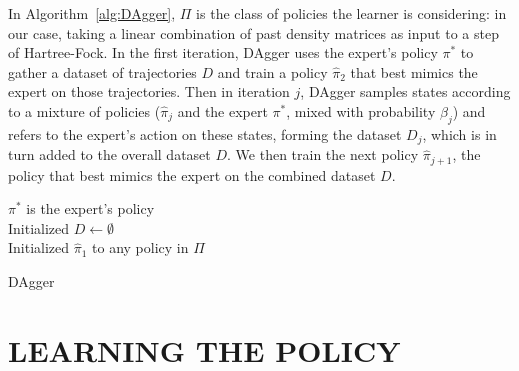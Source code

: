 \documentclass[twoside,11pt]{article}
\begin{document}
In Algorithm~\ref{alg:DAgger}, $\Pi$ is the class of policies the learner is considering: in our case, taking a linear combination of past density matrices as input to a step of Hartree-Fock. In the first iteration, DAgger uses the expert's policy $\pi^*$ to gather a dataset of trajectories $D$ and train a policy $\hat{\pi}_2$ that best mimics the expert on those trajectories. 
Then in iteration $j$, DAgger samples states according to a mixture of policies ($\hat{\pi}_j$ and the expert $\pi^*$, mixed with probability $\beta_j$) and refers to the expert's action on these states, forming the dataset $D_j$, which is in turn added to the overall dataset $D$. We then train the next policy $\hat{\pi}_{j+1}$, the policy that best mimics the expert on the combined dataset $D$.  


\begin{algorithm}[htb]
 $\pi^*$  is the expert’s policy \\
 Initialized $D \leftarrow \emptyset$ \\
 Initialized $\hat{\pi}_1$ to any policy in $\Pi$ \\
 \caption{DAgger}
 \label{alg:DAgger}
\end{algorithm}

\section{LEARNING THE POLICY} \label{sec:policy}

\end{document}

